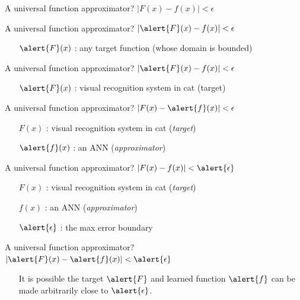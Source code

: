 \documentclass[10pt]{beamer}
\begin{document}
\begin{frame}[fragile]{A universal function approximator?}
$|F(x) - f(x)| < \epsilon$
\end{frame}

\begin{frame}[fragile]{A universal function approximator?}
$|\alert{F}(x) - f(x)| < \epsilon$
\begin{itemize}
    \item[$\alert{F}(x)$] : any target function (whose domain is bounded)
\end{itemize}
\end{frame}

\begin{frame}[fragile]{A universal function approximator?}
$|\alert{F}(x) - f(x)| < \epsilon$
\begin{itemize}
    \item[$\alert{F}(x)$] : visual recognition system in cat (target)
\end{itemize}
\end{frame}

\begin{frame}[fragile]{A universal function approximator?}
$|F(x) - \alert{f}(x)| < \epsilon$ 
\begin{itemize}
\item[$F(x)$] : visual recognition system in cat (\textit{target})\\
\item[$\alert{f}(x)$] : an ANN (\textit{approximator})
\end{itemize}
\end{frame}

\begin{frame}[fragile]{A universal function approximator?}
$|F(x) - f(x)| < \alert{\epsilon}$ 
\begin{itemize}
\item[$F(x)$] : visual recognition system in cat (\textit{target})\\
\item[$f(x)$] : an ANN (\textit{approximator})
\item[$\alert{\epsilon}$] : the max error boundary
\end{itemize}
\end{frame}

\begin{frame}[fragile]{A universal function approximator?}
$|\alert{F}(x) - \alert{f}(x)| < \alert{\epsilon}$ 
\begin{itemize}
\item[] It is possible the target $\alert{F}$ and learned function $\alert{f}$ can be made arbitrarily close to $\alert{\epsilon}$.
\end{itemize}
\end{frame}
\end{document}
